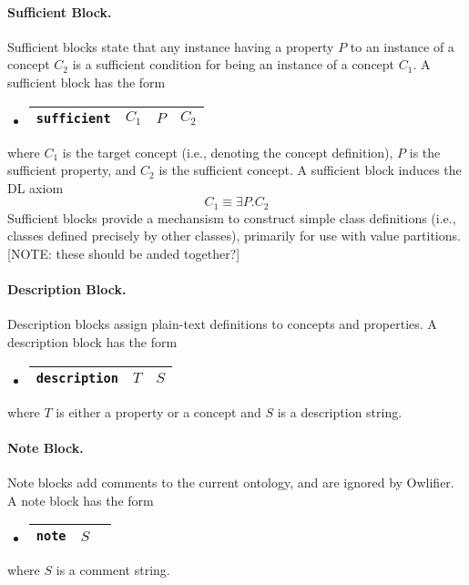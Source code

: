 \documentclass[preprint,number]{elsarticle}
\newcommand{\owlifier}{Owlifier}
\begin{document}
\paragraph{Sufficient Block.} Sufficient blocks state that any
instance having a property $P$ to an instance of a concept $C_2$ is a
sufficient condition for being an instance of a concept $C_1$. A
sufficient block has the form
\begin{itemize}
\item[]
  \begin{tabular}{|l|l|l|l|}\hline \texttt{sufficient} & $C_1$ & $P$ & $C_2$
    \\ \hline
  \end{tabular}
\end{itemize}
where $C_1$ is the target concept (i.e., denoting the concept
definition), $P$ is the sufficient property, and $C_2$ is the
sufficient concept. A sufficient block induces the DL axiom \[C_1
\equiv \exists P.C_2\] Sufficient blocks provide a mechansism to
construct simple class definitions (i.e., classes defined precisely by
other classes), primarily for use with value partitions. [NOTE: these
should be anded together?]

\paragraph{Description Block.} Description blocks assign plain-text
definitions to concepts and properties. A description block has the
form
\begin{itemize}
\item[]
  \begin{tabular}{|l|l|l|}\hline \texttt{description} & $T$ & $S$
\\ \hline
  \end{tabular}
\end{itemize}
where $T$ is either a property or a concept and $S$ is a description
string.

\paragraph{Note Block.} Note blocks add comments to the current
ontology, and are ignored by \owlifier.  A note block has the form
\begin{itemize}
\item[]
  \begin{tabular}{|l|l|l|}\hline \texttt{note} & $S$
\\ \hline
  \end{tabular}
\end{itemize}
where $S$ is a comment string.
\end{document}
